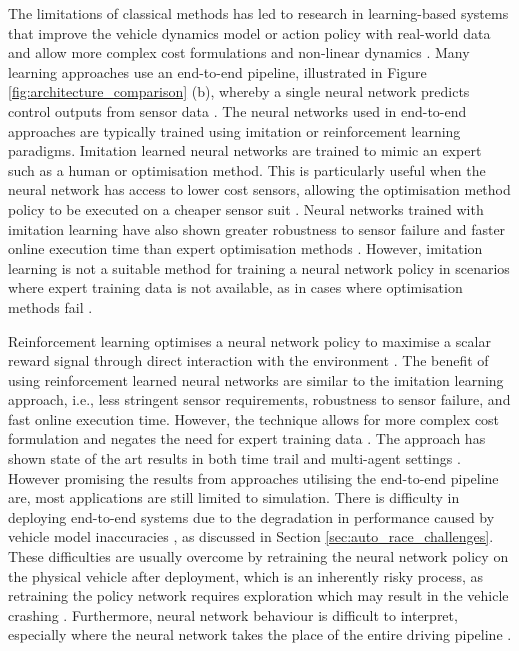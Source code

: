 The limitations of classical methods has led to research in learning-based systems that improve the vehicle dynamics model or action policy with real-world data and allow more complex cost formulations and non-linear dynamics \cite{Fuchs2021}.
Many learning approaches use an end-to-end pipeline, illustrated in Figure \ref{fig:architecture_comparison} (b), whereby a single neural network predicts control outputs from sensor data \cite{Betz2021}.
The neural networks used in end-to-end approaches are typically trained using imitation or reinforcement learning paradigms.
Imitation learned neural networks are trained to mimic an expert such as a human or optimisation method.
This is particularly useful when the neural network has access to lower cost sensors, allowing the optimisation method policy to be executed on a cheaper sensor suit \cite{Pan2017}. 
Neural networks trained with imitation learning have also shown greater robustness to sensor failure and faster online execution time \cite{Wadekar2021} than expert optimisation methods \cite{Lee2019}. 
However, imitation learning is not a suitable method for training a neural network policy in scenarios where expert training data is not available, as in cases where optimisation methods fail \cite{Fuchs2021a}.

Reinforcement learning optimises a neural network policy to maximise a scalar reward signal through direct interaction with the environment \cite{Plaat_2022}. 
The benefit of using reinforcement learned neural networks are similar to the imitation learning approach, i.e., less stringent sensor requirements, robustness to sensor failure, and fast online execution time. However, the technique allows for more complex cost formulation and negates the need for expert training data \cite{Fuchs2021}.
The approach has shown state of the art results in both time trail and multi-agent settings \cite{Song2021}.
However promising the results from approaches utilising the end-to-end pipeline are, most applications are still limited to simulation.
There is difficulty in deploying end-to-end systems due to the degradation in performance caused by vehicle model inaccuracies \cite{Ivanov2020}, as discussed in Section \ref{sec:auto_race_challenges}. 
These difficulties are usually overcome by retraining the neural network policy on the physical vehicle after deployment, which is an inherently risky process, as retraining the policy network requires exploration which may result in the vehicle crashing \cite{Chisari2021}.
Furthermore, neural network behaviour is difficult to interpret, especially where the neural network takes the place of the entire driving pipeline \cite{Evans2021}.



